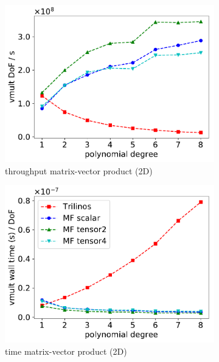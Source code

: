 \documentclass[AMA,STIX1COL]{WileyNJD-v2}
\begin{document}
\begin{figure}
  \centering
  \begin{subfigure}[b]{0.32\textwidth}
      \centering
      \includegraphics[width=\textwidth]{IWR_newest_patched_throughput2d.pdf}
      \caption{throughput matrix-vector product (2D)}
  \end{subfigure}
  \begin{subfigure}[b]{0.32\textwidth}
      \centering
      \includegraphics[width=\textwidth]{IWR_newest_patched_timing2d.pdf}
      \caption{time matrix-vector product (2D)}
      \label{fig:benchmark_miehe_IWR_vmult2}
  \end{subfigure}
  \begin{subfigure}[b]{0.32\textwidth}

\end{subfigure}
\end{figure}
\end{document}
